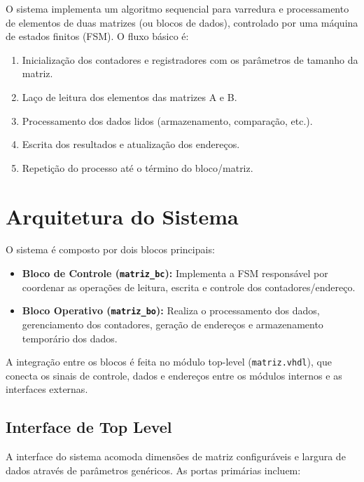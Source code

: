 \documentclass[conference]{IEEEtran}
\begin{document}
O sistema implementa um algoritmo sequencial para varredura e processamento de elementos de duas matrizes (ou blocos de dados), controlado por uma máquina de estados finitos (FSM). O fluxo básico é:

\begin{enumerate}
    \item Inicialização dos contadores e registradores com os parâmetros de tamanho da matriz.
    \item Laço de leitura dos elementos das matrizes A e B.
    \item Processamento dos dados lidos (armazenamento, comparação, etc.).
    \item Escrita dos resultados e atualização dos endereços.
    \item Repetição do processo até o término do bloco/matriz.
\end{enumerate}

\section{Arquitetura do Sistema}

O sistema é composto por dois blocos principais:

\begin{itemize}
    \item \textbf{Bloco de Controle (\texttt{matriz\_bc}):} Implementa a FSM responsável por coordenar as operações de leitura, escrita e controle dos contadores/endereço.
    \item \textbf{Bloco Operativo (\texttt{matriz\_bo}):} Realiza o processamento dos dados, gerenciamento dos contadores, geração de endereços e armazenamento temporário dos dados.
\end{itemize}

A integração entre os blocos é feita no módulo top-level (\texttt{matriz.vhdl}), que conecta os sinais de controle, dados e endereços entre os módulos internos e as interfaces externas.

\subsection{Interface de Top Level}

A interface do sistema acomoda dimensões de matriz configuráveis e largura de dados através de parâmetros genéricos. As portas primárias incluem:
\end{document}
